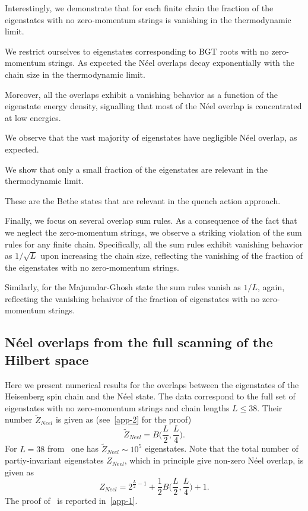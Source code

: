 \documentclass[11pt]{iopart}
\begin{document}
Interestingly, we demonstrate that for each finite chain the fraction of the 
eigenstates with no zero-momentum strings is vanishing in the thermodynamic limit. 

We restrict ourselves to eigenstates corresponding to BGT roots with no 
zero-momentum strings. As expected the N\'eel overlaps decay exponentially with 
the chain size in the thermodynamic limit. 

Moreover, all the overlaps exhibit a vanishing behavior as a function of the eigenstate 
energy density, signalling that most of the N\'eel overlap is concentrated at low 
energies. 

We observe that the vast majority of eigenstates have negligible N\'eel overlap, 
as expected. 

We show that only a small fraction of the eigenstates are relevant in the 
thermodynamic limit. 

These are the Bethe states that are relevant in the quench action approach. 

Finally, we focus on several overlap sum rules. As a consequence of the fact that we 
neglect the zero-momentum strings, we observe a striking violation of the sum rules 
for any finite chain. Specifically, all the sum rules exhibit vanishing behavior 
as $1/\sqrt{L}$ upon increasing the chain size, reflecting the vanishing of the 
fraction of the eigenstates with no zero-momentum strings. 

Similarly, for the Majumdar-Ghosh state the sum rules vanish as $1/L$, again, 
reflecting the vanishing behaivor of the fraction of eigenstates with no 
zero-momentum strings. 


\subsection{N\'eel overlaps from the  full scanning of the Hilbert space}
\label{sec:5.1}

Here we present numerical results for the overlaps between the eigenstates of the 
Heisenberg spin chain and the N\'eel state. The data correspond to the full set 
of eigenstates with no zero-momentum strings and chain lengths $L\le 38$. Their 
number $\widetilde Z_{Neel}$ is given as (see~\ref{app-2} for the proof) 
%
\begin{equation}
\label{ztilde}
\widetilde Z_{Neel}=B\Big(\frac{L}{2},\frac{L}{4}\Big).
\end{equation}
%
For $L=38$ from~ one has $\widetilde Z_{Neel}\sim 10^5$ eigenstates. 
Note that the total number of partiy-invariant eigenstates $Z_{Neel}$, which 
in principle give non-zero N\'eel overlap, is given as 
%
\begin{equation}
\label{zneel1}
Z_{Neel}=2^{\frac{L}{2}-1}+\frac{1}{2}B\Big(\frac{L}{2},\frac{L}{4}\Big)+1.
\end{equation}
%
The proof of~ is reported in~\ref{app-1}. 
\end{document}
